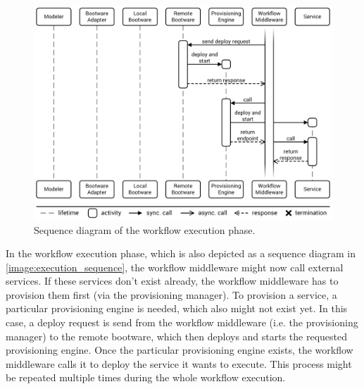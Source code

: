 \begin{figure}[!htbp]
	\centering
	\includegraphics[resolution=600]{process/assets/workflow_execution_sequence}
	\caption{Sequence diagram of the workflow execution phase.}
	\label{image:execution_sequence}
\end{figure}

In the workflow execution phase, which is also depicted as a sequence diagram in \autoref{image:execution_sequence}, the workflow middleware might now call external services.
If these services don't exist already, the workflow middleware has to provision them first (via the provisioning manager).
To provision a service, a particular provisioning engine is needed, which also might not exist yet.
In this case, a deploy request is send from the workflow middleware (i.e. the provisioning manager) to the remote bootware, which then deploys and starts the requested provisioning engine.
Once the particular provisioning engine exists, the workflow middleware calls it to deploy the service it wants to execute.
This process might be repeated multiple times during the whole workflow execution.

